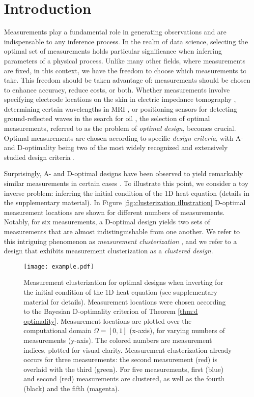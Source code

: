 \section{Introduction}\label{section:intro}
Measurements play a fundamental role in generating observations and
are indispensable to any inference process. In the realm of data
science, selecting the optimal set of measurements holds particular
significance when inferring parameters of a physical process. Unlike
many other fields, where measurements are fixed, in this context, we
have the freedom to choose which measurements to take. This freedom
should be taken advantage of: measurements should be chosen to enhance
accuracy, reduce costs, or both. Whether measurements involve
specifying electrode locations on the skin in electric impedance
tomography \cite{horesh2010impedance}, determining certain wavelengths
in MRI \cite{horesh2008mri}, or positioning sensors for detecting
ground-reflected waves in the search for oil
\cite{horesh2008borehole}, the selection of optimal measurements,
referred to as the problem of \emph{optimal design}, becomes
crucial. Optimal measurements are chosen according to specific
\emph{design criteria}, with A- and D-optimality being two of the most
widely recognized and extensively studied design criteria
\cite{Chaloner1995}.


Surprisingly, A- and D-optimal designs have been observed to yield
remarkably similar measurements in certain cases \cite{fedorov1996,
  nyberg2012, fedorov1997, Ucinski05, neitzel2019sparse}. To
illustrate this point, we consider a toy inverse problem: inferring
the initial condition of the 1D heat equation (details in the
supplementary material). In Figure \ref{fig:clusterization
  illustration} D-optimal measurement locations are shown for
different numbers of measurements. Notably, for six measurements, a
D-optimal design yields two sets of measurements that are almost
indistinguishable from one another. We refer to this intriguing
phenomenon as \emph{measurement clusterization} \cite{Ucinski05}, and
we refer to a design that exhibits measurement clusterization as a
\emph{clustered design}.


\begin{figure}
    \centering
    \texttt{[image: example.pdf]}
    \caption{Measurement clusterization for optimal designs when
      inverting for the initial condition of the 1D heat equation (see
      supplementary material for details). Measurement locations were
      chosen according to the Bayesian D-optimality criterion of
      Theorem \ref{thm:d optimality}. Measurement locations are
      plotted over the computational domain \(\Omega = [0, 1]\)
      (x-axis), for varying numbers of measurements (y-axis). The
      colored numbers are measurement indices, plotted for visual
      clarity. Measurement clusterization already occurs for three
      measurements: the second measurement (red) is overlaid with the
      third (green). For five measurements, first (blue) and second
      (red) measurements are clustered, as well as the fourth (black)
      and the fifth (magenta).}
  \label{fig:clusterization illustration}
\end{figure}


